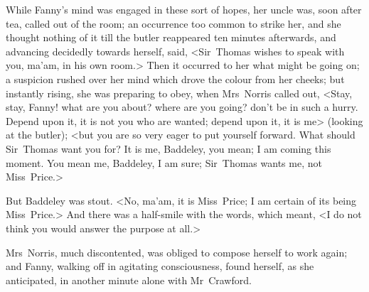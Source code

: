While Fanny's mind was engaged in these sort of hopes, her uncle was, soon after tea, called out of the room; an occurrence too common to strike her, and she thought nothing of it till the butler reappeared ten minutes afterwards, and advancing decidedly towards herself, said, <Sir~Thomas wishes to speak with you, ma'am, in his own room.> Then it occurred to her what might be going on; a suspicion rushed over her mind which drove the colour from her cheeks; but instantly rising, she was preparing to obey, when Mrs~Norris called out, <Stay, stay, Fanny! what are you about? where are you going? don't be in such a hurry. Depend upon it, it is not you who are wanted; depend upon it, it is me> (looking at the butler); <but you are so very eager to put yourself forward. What should Sir~Thomas want you for? It is me, Baddeley, you mean; I am coming this moment. You mean me, Baddeley, I am sure; Sir~Thomas wants me, not Miss~Price.>

But Baddeley was stout. <No, ma'am, it is Miss~Price; I am certain of its being Miss~Price.> And there was a half-smile with the words, which meant, <I do not think you would answer the purpose at all.>

Mrs~Norris, much discontented, was obliged to compose herself to work again; and Fanny, walking off in agitating consciousness, found herself, as she anticipated, in another minute alone with Mr~Crawford. 